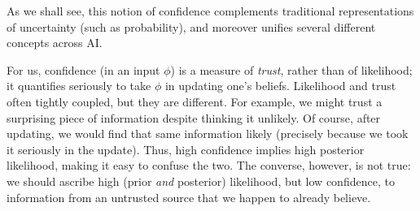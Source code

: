 As we shall see, this notion of confidence
complements traditional representations of uncertainty (such as probability), 
and moreover unifies several different concepts
across AI.


For us, confidence (in an input $\phi$) is a measure of \emph{trust}, rather than of likelihood; it quantifies seriously to take $\phi$ in updating one's beliefs.
Likelihood and trust often tightly coupled, but they are different.
For example, we might trust a surprising piece of information despite thinking it unlikely.
%
Of course, after updating, we would find that same information likely (precisely because we took it seriously in the update).
%
Thus, high confidence implies high posterior likelihood, making it easy to confuse the two.
The converse, however, is not true:
we should ascribe high (prior \emph{and} posterior) likelihood, but low confidence, to information from an untrusted source that we happen to already believe.

